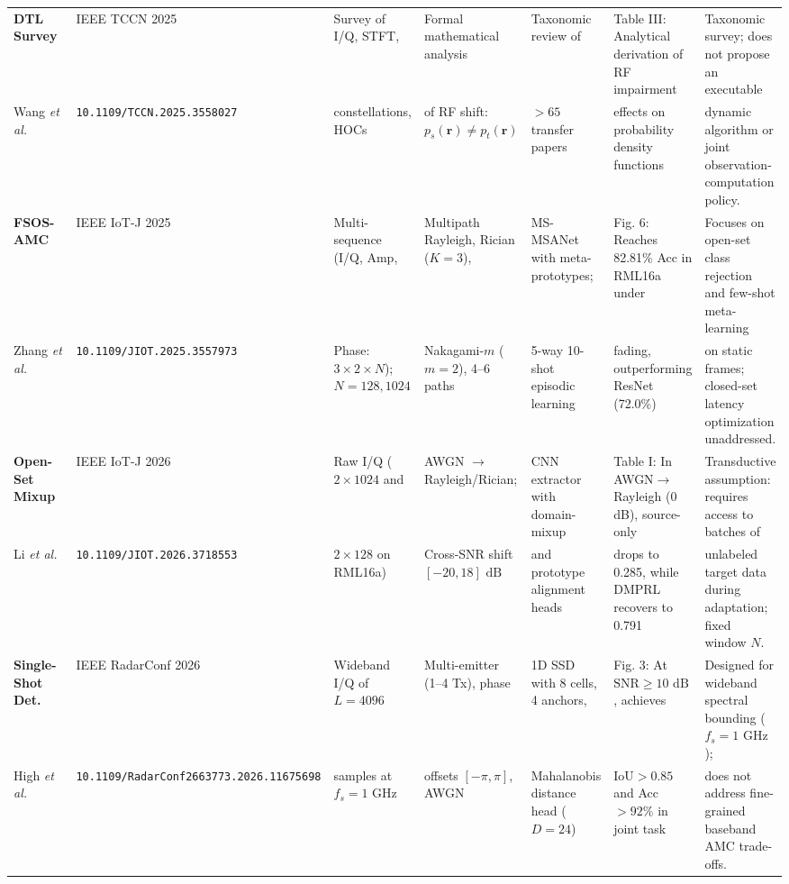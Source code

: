 \begin{table}[!t]
{\begin{tabular}{|l|l|l|l|l|l|l|}
\textbf{DTL Survey}~\cite{wang2025survey} & 
IEEE TCCN 2025 & 
Survey of I/Q, STFT, & 
Formal mathematical analysis & 
Taxonomic review of & 
Table III: Analytical derivation of RF impairment & 
Taxonomic survey; does not propose an executable \\
Wang \emph{et al.} & 
\texttt{10.1109/TCCN.2025.3558027} & 
constellations, HOCs & 
of RF shift: $p_s(\mathbf{r}) \ne p_t(\mathbf{r})$ & 
$>65$ transfer papers & 
effects on probability density functions & 
dynamic algorithm or joint observation-computation policy. \\ \hline

\textbf{FSOS-AMC}~\cite{zhang2025fsos} & 
IEEE IoT-J 2025 & 
Multi-sequence (I/Q, Amp, & 
Multipath Rayleigh, Rician ($K=3$), & 
MS-MSANet with meta-prototypes; & 
Fig. 6: Reaches 82.81\% Acc in RML16a under & 
Focuses on open-set class rejection and few-shot meta-learning \\
Zhang \emph{et al.} & 
\texttt{10.1109/JIOT.2025.3557973} & 
Phase: $3\times 2\times N$); $N=128, 1024$ & 
Nakagami-$m$ ($m=2$), 4--6 paths & 
5-way 10-shot episodic learning & 
fading, outperforming ResNet (72.0\%) & 
on static frames; closed-set latency optimization unaddressed. \\ \hline

\textbf{Open-Set Mixup}~\cite{li2026openset} & 
IEEE IoT-J 2026 & 
Raw I/Q ($2 \times 1024$ and & 
AWGN $\to$ Rayleigh/Rician; & 
CNN extractor with domain-mixup & 
Table I: In AWGN$\to$Rayleigh (0 dB), source-only & 
Transductive assumption: requires access to batches of \\
Li \emph{et al.} & 
\texttt{10.1109/JIOT.2026.3718553} & 
$2 \times 128$ on RML16a) & 
Cross-SNR shift $[-20, 18]\text{ dB}$ & 
and prototype alignment heads & 
drops to 0.285, while DMPRL recovers to 0.791 & 
unlabeled target data during adaptation; fixed window $N$. \\ \hline

\textbf{Single-Shot Det.}~\cite{high2026singleshot} & 
IEEE RadarConf 2026 & 
Wideband I/Q of $L=4096$ & 
Multi-emitter (1--4 Tx), phase & 
1D SSD with 8 cells, 4 anchors, & 
Fig. 3: At $\text{SNR} \ge 10\text{ dB}$, achieves & 
Designed for wideband spectral bounding ($f_s=1\text{ GHz}$); \\
High \emph{et al.} & 
\texttt{10.1109/RadarConf2663773.2026.11675698} & 
samples at $f_s=1\text{ GHz}$ & 
offsets $[-\pi, \pi]$, AWGN & 
Mahalanobis distance head ($D=24$) & 
$\text{IoU} > 0.85$ and Acc $>92\%$ in joint task & 
does not address fine-grained baseband AMC trade-offs. \\ \hline\hline


\end{tabular}}
\end{table}

